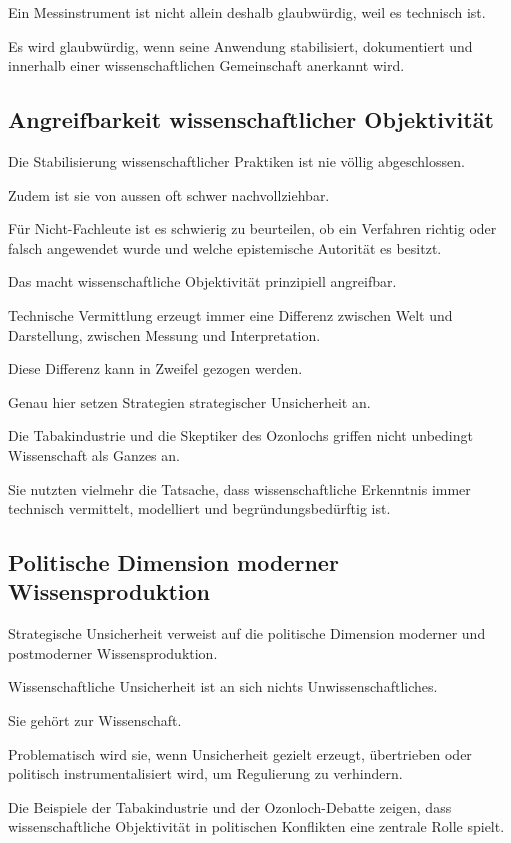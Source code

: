 Ein Messinstrument ist nicht allein deshalb glaubwürdig,
weil es technisch ist.

Es wird glaubwürdig,
wenn seine Anwendung stabilisiert,
dokumentiert
und innerhalb einer wissenschaftlichen Gemeinschaft
anerkannt wird.

\subsection{Angreifbarkeit wissenschaftlicher Objektivität}

Die Stabilisierung wissenschaftlicher Praktiken
ist nie völlig abgeschlossen.

Zudem ist sie von aussen
oft schwer nachvollziehbar.

Für Nicht-Fachleute ist es schwierig zu beurteilen,
ob ein Verfahren richtig oder falsch angewendet wurde
und welche epistemische Autorität es besitzt.

Das macht wissenschaftliche Objektivität
prinzipiell angreifbar.

Technische Vermittlung erzeugt immer eine Differenz
zwischen Welt und Darstellung,
zwischen Messung und Interpretation.

Diese Differenz kann in Zweifel gezogen werden.

Genau hier setzen Strategien
strategischer Unsicherheit an.

Die Tabakindustrie
und die Skeptiker des Ozonlochs
griffen nicht unbedingt Wissenschaft als Ganzes an.

Sie nutzten vielmehr die Tatsache,
dass wissenschaftliche Erkenntnis
immer technisch vermittelt,
modelliert
und begründungsbedürftig ist.

\subsection{Politische Dimension moderner Wissensproduktion}

Strategische Unsicherheit verweist
auf die politische Dimension
moderner und postmoderner Wissensproduktion.

Wissenschaftliche Unsicherheit
ist an sich nichts Unwissenschaftliches.

Sie gehört zur Wissenschaft.

Problematisch wird sie,
wenn Unsicherheit gezielt erzeugt,
übertrieben
oder politisch instrumentalisiert wird,
um Regulierung zu verhindern.

Die Beispiele der Tabakindustrie
und der Ozonloch-Debatte zeigen,
dass wissenschaftliche Objektivität
in politischen Konflikten
eine zentrale Rolle spielt.

